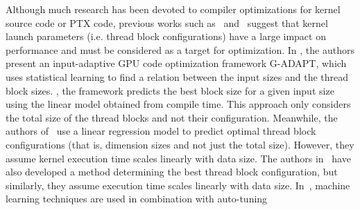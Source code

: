 Although much research has been devoted to compiler optimizations 
for kernel source code or PTX code, previous works such
as~\cite{DBLP:conf/cascon/ChenCKMX15} and~\cite{DBLP:journals/tjs/TorresGL13}
suggest that kernel launch
parameters (i.e. thread block configurations)
have a large impact on performance and must be considered
as a target for optimization.
In \cite{liu2009cross}, the authors present an input-adaptive GPU code
optimization framework G-ADAPT, which uses statistical learning to
find a relation between the input sizes and the thread block sizes.
, the framework predicts the best block size
for a given input size using the linear model obtained from compile
time.  This approach only considers the total size of the thread
blocks and not their configuration.  Meanwhile, the authors
of~\cite{DBLP:books/daglib/p/SatoTKK10} use a linear regression model
to predict optimal thread block configurations (that is, dimension
sizes and not just the total size). However, they assume kernel execution time
scales linearly with data size.
The authors in~\cite{DBLP:conf/icpp/LimNM17}
have also developed a method determining the best thread block configuration, 
but similarly, they assume execution time scales linearly with data size.
%
In~\cite{DBLP:conf/icpp/GarveyA15},
machine learning techniques are used in combination with auto-tuning
